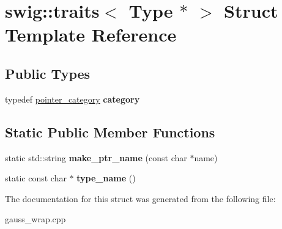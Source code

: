\hypertarget{structswig_1_1traits_3_01_type_01_5_01_4}{\section{swig\-:\-:traits$<$ Type $\ast$ $>$ Struct Template Reference}
\label{structswig_1_1traits_3_01_type_01_5_01_4}
}
\subsection*{Public Types}
\begin{DoxyCompactItemize}
\item 
\hypertarget{structswig_1_1traits_3_01_type_01_5_01_4_a500d091f0454ce9f328c030b191ac18f}{typedef \hyperlink{structswig_1_1pointer__category}{pointer\-\_\-category} {\bfseries category}}\label{structswig_1_1traits_3_01_type_01_5_01_4_a500d091f0454ce9f328c030b191ac18f}

\end{DoxyCompactItemize}
\subsection*{Static Public Member Functions}
\begin{DoxyCompactItemize}
\item 
\hypertarget{structswig_1_1traits_3_01_type_01_5_01_4_a5251b3fb5f48a5a48f17c25cafe21817}{static std\-::string {\bfseries make\-\_\-ptr\-\_\-name} (const char $\ast$name)}\label{structswig_1_1traits_3_01_type_01_5_01_4_a5251b3fb5f48a5a48f17c25cafe21817}

\item 
\hypertarget{structswig_1_1traits_3_01_type_01_5_01_4_ac5aae8203a9a4b151f6719e58a0cc252}{static const char $\ast$ {\bfseries type\-\_\-name} ()}\label{structswig_1_1traits_3_01_type_01_5_01_4_ac5aae8203a9a4b151f6719e58a0cc252}

\end{DoxyCompactItemize}


The documentation for this struct was generated from the following file\-:\begin{DoxyCompactItemize}
\item 
gauss\-\_\-wrap.\-cpp\end{DoxyCompactItemize}

